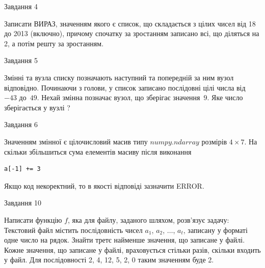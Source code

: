 \documentclass[12pt, ukrainian]{article}
\begin{document}
{\begin{minipage}[t]{8.0cm}
\end{minipage}


               
{\begin{center}Завдання {4}\end{center}}
\vspace{-4mm}

Записати ВИРАЗ, значенням якого є список, що складається з цілих чисел від 18 до 2013 (включно), причому спочатку за зростанням записано всі, що діляться на 2, а потім решту за зростанням.\par

\vspace{10mm}
               
{\begin{center}Завдання {5}\end{center}}
\vspace{-4mm}
Змінні  та  вузла списку позначають наступний та попередній за ним вузол відповідно. Починаючи з голови, у список записано послідовні цілі числа від~$-43$ до~$49$. Нехай змінна  позначає вузол, що зберігає значення~$9$.
Яке число зберігається у вузлі  ?\par

               
{\begin{center}Завдання {6}\end{center}}
\vspace{-4mm}
Значенням змінної  є цілочисловий масив типу $numpy.ndarray$ розмірів $4{\times}7$. На скільки збільшиться сума елементів масиву  після виконання
\begin{verbatim}
a[-1] += 3
\end{verbatim}


Якщо код некоректний, то в якості відповіді зазначити ERROR.\par

               
{\begin{center}Завдання {10}\end{center}}
\vspace{-4mm}

Написати функцію $f$, яка для файлу, заданого шляхом, розв’язує задачу:\\ Текстовий файл містить послідовність чисел $a_1$, $a_2$, $\ldots$, $a_t$, записану у форматі одне число на рядок. Знайти третє найменше значення, що записане у файлі. Кожне значення, що записане у файлі, враховується стільки разів, скільки входить у файл. Для послідовності 2, 4, 12, 5, 2, 0 таким значенням буде 2.

}
\end{document}
